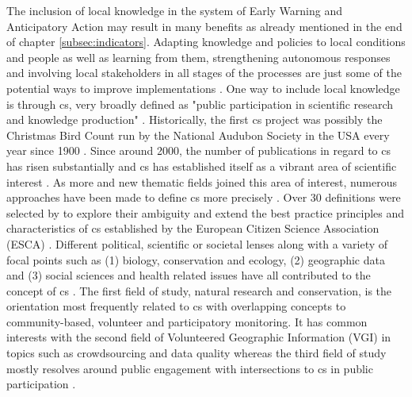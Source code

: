 The inclusion of local knowledge in the system of Early Warning and Anticipatory Action may result in many benefits as already mentioned in the end of chapter \ref{subsec:indicators}. Adapting knowledge and policies to local conditions and people as well as learning from them, strengthening autonomous responses and involving local stakeholders in all stages of the processes are just some of the potential ways to improve implementations \autocite{giordanoIntegrationLocalScientific2013a,idmpDroughtWaterScarcity2022,lackstromBackyardHydroclimatologyCitizen2022,lealfilhoRoleIndigenousKnowledge2022,lealfilhoUnderstandingResponsesClimaterelated2022}. One way to include local knowledge is through \acrfull{cs}, very broadly defined as "public participation in scientific research and knowledge production" \autocite{fraislCitizenScienceEnvironmental2022}.\newline
Historically, the first \acrlong{cs} project was possibly the Christmas Bird Count run by the National Audubon Society in the USA every year since 1900 \autocite{linkHierarchicalModelRegional2006,silvertownNewDawnCitizen2009}. Since around 2000, the number of publications in regard to \acrshort{cs} has risen substantially and \acrshort{cs} has established itself as a vibrant area of scientific interest \autocite{kirschkeCitizenScienceProjects2022}. As more and new thematic fields joined this area of interest, numerous approaches have been made to define \acrshort{cs} more precisely \autocite{haklayWhatCitizenScience2021}.\newline
Over 30 definitions were selected by \autocite{haklayWhatCitizenScience2021} to explore their ambiguity and extend the best practice principles and characteristics of \acrshort{cs} established by the European Citizen Science Association (ESCA) \autocite{escaTenPrinciplesCitizen2015,escaECSACharacteristicsCitizen2020}. Different political, scientific or societal lenses along with a variety of focal points such as (1) biology, conservation and ecology, (2) geographic data and (3) social sciences and health related issues have all contributed to the concept of \acrlong{cs} \autocite{haklayWhatCitizenScience2021,kirschkeCitizenScienceProjects2022}. The first field of study, natural research and conservation, is the orientation most frequently related to \acrshort{cs} with overlapping concepts to community-based, volunteer and participatory monitoring. It has common interests with the second field of Volunteered Geographic Information (VGI) in topics such as crowdsourcing and data quality whereas the third field of study mostly resolves around public engagement with intersections to \acrshort{cs} in public participation \autocite{kullenbergWhatCitizenScience2016}.\newline
